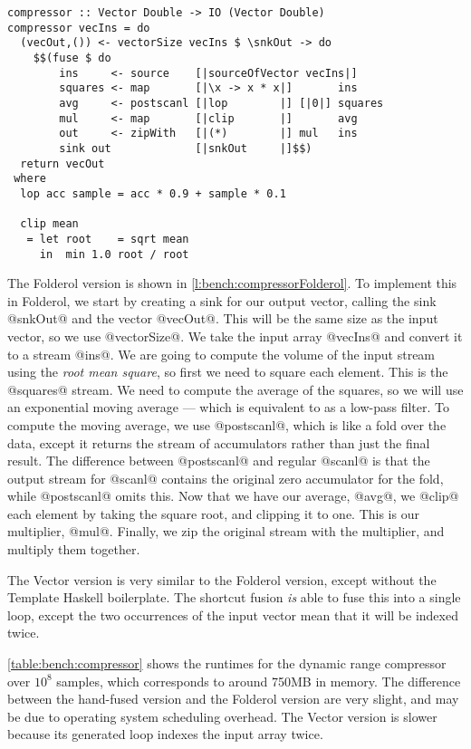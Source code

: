\begin{lstlisting}[float,label=l:bench:compressorFolderol,caption=Folderol implementation of compressor]
compressor :: Vector Double -> IO (Vector Double)
compressor vecIns = do
  (vecOut,()) <- vectorSize vecIns $ \snkOut -> do
    $$(fuse $ do
        ins     <- source    [|sourceOfVector vecIns|]
        squares <- map       [|\x -> x * x|]       ins
        avg     <- postscanl [|lop        |] [|0|] squares
        mul     <- map       [|clip       |]       avg
        out     <- zipWith   [|(*)        |] mul   ins
        sink out             [|snkOut     |]$$)
  return vecOut
 where
  lop acc sample = acc * 0.9 + sample * 0.1

  clip mean
   = let root    = sqrt mean
     in  min 1.0 root / root
\end{lstlisting}

The Folderol version is shown in \autoref{l:bench:compressorFolderol}.
To implement this in Folderol, we start by creating a sink for our output vector, calling the sink @snkOut@ and the vector @vecOut@.
This will be the same size as the input vector, so we use @vectorSize@.
We take the input array @vecIns@ and convert it to a stream @ins@.
We are going to compute the volume of the input stream using the \emph{root mean square}, so first we need to square each element.
This is the @squares@ stream.
We need to compute the average of the squares, so we will use an exponential moving average --- which is equivalent to as a low-pass filter.
To compute the moving average, we use @postscanl@, which is like a fold over the data, except it returns the stream of accumulators rather than just the final result.
The difference between @postscanl@ and regular @scanl@ is that the output stream for @scanl@ contains the original zero accumulator for the fold, while @postscanl@ omits this.
Now that we have our average, @avg@, we @clip@ each element by taking the square root, and clipping it to one. This is our multiplier, @mul@.
Finally, we zip the original stream with the multiplier, and multiply them together.

The Vector version is very similar to the Folderol version, except without the Template Haskell boilerplate.
The shortcut fusion \emph{is} able to fuse this into a single loop, except the two occurrences of the input vector mean that it will be indexed twice.

\autoref{table:bench:compressor} shows the runtimes for the dynamic range compressor over $10^8$ samples, which corresponds to around 750MB in memory.
The difference between the hand-fused version and the Folderol version are very slight, and may be due to operating system scheduling overhead. 
The Vector version is slower because its generated loop indexes the input array twice.

